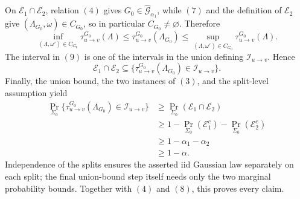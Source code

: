 On \(\mathcal E_1\cap\mathcal E_2\), relation \((4)\) gives
\(G_0\in\widehat{\mathcal G}_{\alpha_1}\), while \((7)\) and the definition of \(\mathcal E_2\) give
\((\Lambda_{G_0},\omega)\in C_{G_0}\), so in particular \(C_{G_0}\ne\varnothing\).  Therefore
\[
 \inf_{(\Lambda,\omega')\in C_{G_0}}
 \tau_{u\to v}^{G_0}(\Lambda)
 \le
 \tau_{u\to v}^{G_0}(\Lambda_{G_0})
 \le
 \sup_{(\Lambda,\omega')\in C_{G_0}}
 \tau_{u\to v}^{G_0}(\Lambda).
\tag{9}
\]
The interval in \((9)\) is one of the intervals in the union defining \(\mathcal I_{u\to v}\).  Hence
\[
 \mathcal E_1\cap\mathcal E_2
 \subseteq
 \{\tau_{u\to v}^{G_0}(\Lambda_{G_0})\in\mathcal I_{u\to v}\}.
\tag{10}
\]
Finally, the union bound, the two instances of \((3)\), and the split-level assumption yield
\[
\begin{aligned}
 \Pr_{\Sigma_0}\{\tau_{u\to v}^{G_0}(\Lambda_{G_0})\in\mathcal I_{u\to v}\}
 &\ge \Pr_{\Sigma_0}(\mathcal E_1\cap\mathcal E_2)\\
 &\ge1-\Pr_{\Sigma_0}(\mathcal E_1^c)-\Pr_{\Sigma_0}(\mathcal E_2^c)\\
 &\ge1-\alpha_1-\alpha_2\\
 &\ge1-\alpha.
\end{aligned}
\]
Independence of the splits ensures the asserted iid Gaussian law separately on each split; the final union-bound step itself needs only the two marginal probability bounds.  Together with \((4)\) and \((8)\), this proves every claim.

